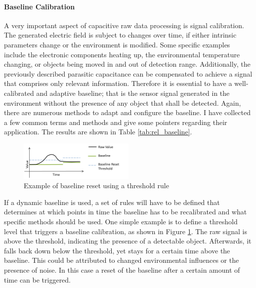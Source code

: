 \paragraph{Baseline Calibration}
A very important aspect of capacitive raw data processing is signal calibration. The generated electric field is subject to changes over time, if either intrinsic parameters change or the environment is modified. Some specific examples include the electronic components heating up, the environmental temperature changing, or objects being moved in and out of detection range. Additionally, the previously described parasitic capacitance can be compensated to achieve a signal that comprises only relevant information. Therefore it is essential to have a well-calibrated and adaptive baseline; that is the sensor signal generated in the environment without the presence of any object that shall be detected. Again, there are numerous methods to adapt and configure the baseline. I have collected a few common terms and methods and give some pointers regarding their application. The results are shown in Table \ref{tab:rel_baseline}. 
\begin{figure}[h]
\centering
\includegraphics[width=0.5\textwidth]{images/baseline_reset}
\caption{Example of baseline reset using a threshold rule}
\label{fig:rel_base_reset}
\end{figure} 
If a dynamic baseline is used, a set of rules will have to be defined that determines at which points in time the baseline has to be recalibrated and what specific methods should be used. One simple example is to define a threshold level that triggers a baseline calibration, as shown in Figure \ref{fig:rel_base_reset}. The raw signal is above the threshold, indicating the presence of a detectable object. Afterwards, it falls back down below the threshold, yet stays for a certain time above the baseline. This could be attributed to changed environmental influences or the presence of noise. In this case a reset of the baseline after a certain amount of time can be triggered.
